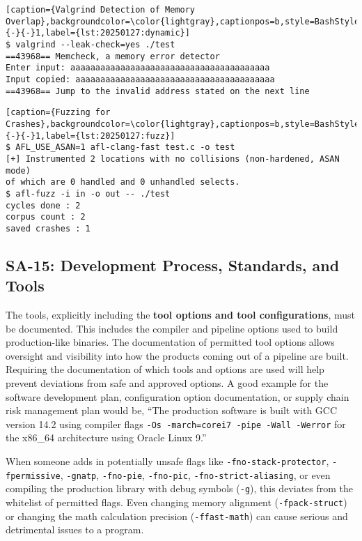 \begin{lstlisting}[caption={Valgrind Detection of Memory Overlap},backgroundcolor=\color{lightgray},captionpos=b,style=BashStyle,literate={-}{-}1,label={lst:20250127:dynamic}]
$ valgrind --leak-check=yes ./test
==43968== Memcheck, a memory error detector
Enter input: aaaaaaaaaaaaaaaaaaaaaaaaaaaaaaaaaaaaaaaa
Input copied: aaaaaaaaaaaaaaaaaaaaaaaaaaaaaaaaaaaaaaaa
==43968== Jump to the invalid address stated on the next line
\end{lstlisting}

\begin{lstlisting}[caption={Fuzzing for Crashes},backgroundcolor=\color{lightgray},captionpos=b,style=BashStyle,literate={-}{-}1,label={lst:20250127:fuzz}]
$ AFL_USE_ASAN=1 afl-clang-fast test.c -o test
[+] Instrumented 2 locations with no collisions (non-hardened, ASAN mode)
of which are 0 handled and 0 unhandled selects.
$ afl-fuzz -i in -o out -- ./test
cycles done : 2
corpus count : 2
saved crashes : 1
\end{lstlisting}

\subsection*{SA-15: Development Process, Standards, and Tools}
The tools, explicitly including the \textbf{tool options and tool configurations}, must be documented. This includes the compiler and pipeline options used to build production-like binaries. The documentation of permitted tool options allows oversight and visibility into how the products coming out of a pipeline are built. Requiring the documentation of which tools and options are used will help prevent deviations from safe and approved options. A good example for the software development plan, configuration option documentation, or supply chain risk management plan would be, ``The production software is built with GCC version 14.2 using compiler flags \texttt{-Os -march=corei7 -pipe -Wall -Werror} for the x86\_64 architecture using Oracle Linux 9.''

When someone adds in potentially unsafe flags like \texttt{-fno-stack-protector}, \texttt{-fpermissive}, \texttt{-gnatp}, \texttt{-fno-pie}, \texttt{-fno-pic}, \texttt{-fno-strict-aliasing}, or even compiling the production library with debug symbols (\texttt{-g}), this deviates from the whitelist of permitted flags. Even changing memory alignment (\texttt{-fpack-struct}) or changing the math calculation precision (\texttt{-ffast-math}) can cause serious and detrimental issues to a program.

